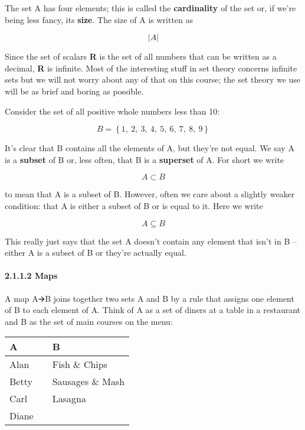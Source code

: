 \documentclass[oneside,english]{amsbook}
\numberwithin{section}{chapter}
\theoremstyle{plain}
\theoremstyle{definition}
\begin{document}
The set A has four elements; this is called the \textbf{cardinality} of
the set or, if we're being less fancy, its \textbf{size}. The size of A
is written as

\[|A|\]

Since the set of scalars \textbf{R} is the set of all numbers that can
be written as a decimal, \textbar{}\textbf{R}\textbar{} is infinite.
Most of the interesting stuff in set theory concerns infinite sets but
we will not worry about any of that on this course; the set theory we
use will be as brief and boring as possible.

Consider the set of all positive whole numbers less than 10:

\[B = \left\{ 1,\ 2,\ 3,\ 4,\ 5,\ 6,\ 7,\ 8,\ 9 \right\}\]

It's clear that B contains all the elements of A, but they're not equal.
We say A is a \textbf{subset} of B or, less often, that B is a
\textbf{superset} of A. For short we write

\[A \subset B\]

to mean that A is a subset of B. However, often we care about a slightly
weaker condition: that A is either a subset of B or is equal to it. Here
we write

\[A \subseteq B\]

This really just says that the set A doesn't contain any element that
isn't in B -- either A is a subset of B or they're actually equal.

\paragraph{2.1.1.2 Maps}\label{maps}

A map A🡪B joins together two sets A and B by a rule that assigns one
element of B to each element of A. Think of A as a set of diners at a
table in a restaurant and B as the set of main courses on the menu:

\begin{longtable}[]{@{}
		>{\centering\arraybackslash}p{}
		>{\centering\arraybackslash}p{}
		>{\centering\arraybackslash}p{}@{}}
	\toprule\noalign{}
	\begin{minipage}[b]{\linewidth}\centering
		\textbf{A}
	\end{minipage} & \begin{minipage}[b]{\linewidth}\centering
	\end{minipage} & \begin{minipage}[b]{\linewidth}\centering
		\textbf{B}
	\end{minipage} \\
	\midrule\noalign{}
	\endhead
	\bottomrule\noalign{}
	\endlastfoot
	Alan & & Fish \& Chips \\
	Betty & & Sausages \& Mash \\
	Carl & & Lasagna \\
	Diane & & \\
\end{longtable}
\end{document}
